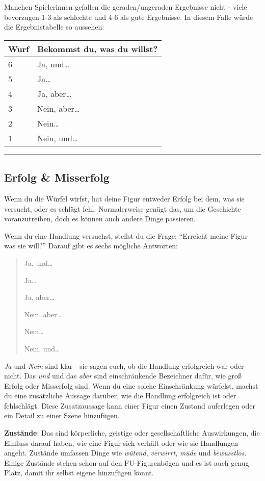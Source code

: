 \documentclass[]{article}
\begin{document}
Manchen Spielerinnen gefallen die geraden/ungeraden Ergebnisse nicht -
viele bevorzugen 1-3 als schlechte und 4-6 als gute Ergebnisse. In
diesem Falle würde die Ergebnistabelle so aussehen:

\begin{longtable}[]{@{}ll@{}}
\toprule
Wurf & Bekommst du, was du willst?\tabularnewline
\midrule
\endhead
6 & Ja, und\ldots{}\tabularnewline
5 & Ja\ldots{}\tabularnewline
4 & Ja, aber\ldots{}\tabularnewline
3 & Nein, aber\ldots{}\tabularnewline
2 & Nein\ldots{}\tabularnewline
1 & Nein, und\ldots{}\tabularnewline
\bottomrule
\end{longtable}

\begin{center}\rule{0.5\linewidth}{\linethickness}\end{center}

\subsection{Erfolg \& Misserfolg}\label{erfolg-misserfolg}

Wenn du die Würfel wirfst, hat deine Figur entweder Erfolg bei dem, was
sie versucht, oder es schlägt fehl. Normalerweise genügt das, um die
Geschichte voranzutreiben, doch es können auch andere Dinge passieren.

Wenn du eine Handlung versuchst, stellst du die Frage: ``Erreicht meine
Figur was sie will?'' Darauf gibt es sechs mögliche Antworten:

\begin{quote}
Ja, und\ldots{}

Ja\ldots{}

Ja, aber\ldots{}

Nein, aber\ldots{}

Nein\ldots{}

Nein, und\ldots{}
\end{quote}

\emph{Ja} und \emph{Nein} sind klar - sie sagen euch, ob die Handlung
erfolgreich war oder nicht. Das \emph{und} und das \emph{aber} sind
einschränkende Bezeichner dafür, wie groß Erfolg oder Misserfolg sind.
Wenn du eine solche Einschränkung würfelst, machst du eine zusätzliche
Aussage darüber, wie die Handlung erfolgreich ist oder fehlschlägt.
Diese Zusatzaussage kann einer Figur einen Zustand auferlegen oder ein
Detail zu einer Szene hinzufügen.

\textbf{Zustände}: Das sind körperliche, geistige oder gesellschaftliche
Auswirkungen, die Einfluss darauf haben, wie eine Figur sich verhält
oder wie sie Handlungen angeht. Zustände umfassen Dinge wie
\emph{wütend}, \emph{verwirrt}, \emph{müde} und \emph{bewusstlos}.
Einige Zustände stehen schon auf den FU-Figurenbögen und es ist auch
genug Platz, damit ihr selbst eigene hinzufügen könnt.
\end{document}

